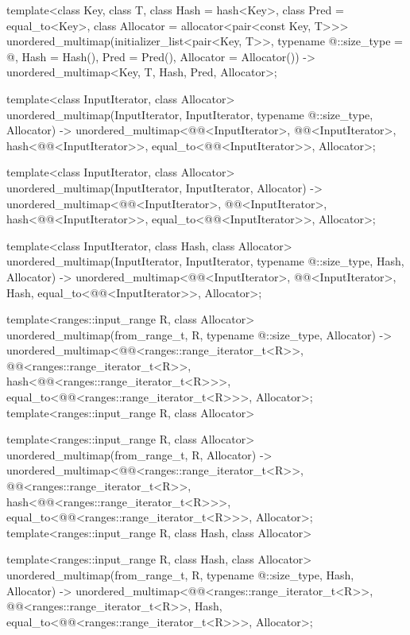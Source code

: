 \documentclass{wg21}
\begin{document}
\begin{codeblock}

template<class Key, class T, class Hash = hash<Key>,
class Pred = equal_to<Key>, class Allocator = allocator<pair<const Key, T>>>
unordered_multimap(initializer_list<pair<Key, T>>,
typename @\seebelow@::size_type = @\seebelow@,
Hash = Hash(), Pred = Pred(), Allocator = Allocator())
-> unordered_multimap<Key, T, Hash, Pred, Allocator>;

template<class InputIterator, class Allocator>
unordered_multimap(InputIterator, InputIterator, typename @\seebelow@::size_type, Allocator)
-> unordered_multimap<@@<InputIterator>, @@<InputIterator>,
hash<@@<InputIterator>>,
equal_to<@@<InputIterator>>, Allocator>;

template<class InputIterator, class Allocator>
unordered_multimap(InputIterator, InputIterator, Allocator)
-> unordered_multimap<@@<InputIterator>, @@<InputIterator>,
hash<@@<InputIterator>>,
equal_to<@@<InputIterator>>, Allocator>;

template<class InputIterator, class Hash, class Allocator>
unordered_multimap(InputIterator, InputIterator, typename @\seebelow@::size_type, Hash,
Allocator)
-> unordered_multimap<@@<InputIterator>, @@<InputIterator>, Hash,
equal_to<@@<InputIterator>>, Allocator>;

\end{codeblock}
\begin{addedblock}
\begin{codeblock}
template<ranges::input_range R, class Allocator>
unordered_multimap(from_range_t, R, typename @\seebelow@::size_type, Allocator)
-> unordered_multimap<@@<ranges::range_iterator_t<R>>,
    @@<ranges::range_iterator_t<R>>,
    hash<@@<ranges::range_iterator_t<R>>>,
    equal_to<@@<ranges::range_iterator_t<R>>>, Allocator>;
    template<ranges::input_range R, class Allocator>

template<ranges::input_range R, class Allocator>
unordered_multimap(from_range_t, R, Allocator)
-> unordered_multimap<@@<ranges::range_iterator_t<R>>,
    @@<ranges::range_iterator_t<R>>,
    hash<@@<ranges::range_iterator_t<R>>>,
    equal_to<@@<ranges::range_iterator_t<R>>>, Allocator>;
    template<ranges::input_range R, class Hash, class Allocator>

template<ranges::input_range R, class Hash, class Allocator>
unordered_multimap(from_range_t, R, typename @\seebelow@::size_type, Hash, Allocator)
-> unordered_multimap<@@<ranges::range_iterator_t<R>>,
    @@<ranges::range_iterator_t<R>>,
    Hash,
    equal_to<@@<ranges::range_iterator_t<R>>>, Allocator>;
\end{codeblock}
\end{addedblock}
\end{document}
